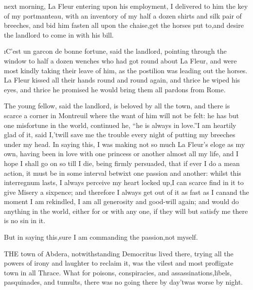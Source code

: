 \documentclass[twoside]{article}
\begin{document}


 next morning, La Fleur entering upon his employment, I delivered to
him the key of my portmanteau, with an inventory of my half a dozen
shirts and silk pair of breeches, and bid him fasten all upon the
chaise,\tsk get the horses put to,\tsk and desire the landlord to come in with
his bill.

\i{C’est un garcon de bonne fortune}, said the landlord, pointing through
the window to half a dozen wenches who had got round about La Fleur, and
were most kindly taking their leave of him, as the postilion was leading
out the horses.  La Fleur kissed all their hands round and round again,
and thrice he wiped his eyes, and thrice he promised he would bring them
all pardons from Rome.

\tsk The young fellow, said the landlord, is beloved by all the town, and
there is scarce a corner in Montreuil where the want of him will not be
felt: he has but one misfortune in the world, continued he, “he is always
in love.”\tsk I am heartily glad of it, said I,\tsk ’twill save me the trouble
every night of putting my breeches under my head.  In saying this, I was
making not so much La Fleur’s eloge as my own, having been in love with
one princess or another almost all my life, and I hope I shall go on so
till I die, being firmly persuaded, that if ever I do a mean action, it
must be in some interval betwixt one passion and another: whilst this
interregnum lasts, I always perceive my heart locked up,\tsk I can scarce
find in it to give Misery a sixpence; and therefore I always get out of
it as fast as I can\tsk and the moment I am rekindled, I am all generosity
and good-will again; and would do anything in the world, either for or
with any one, if they will but satisfy me there is no sin in it.

\tsk But in saying this,\tsk sure I am commanding the passion,\tsk not myself.






\tsk THE town of Abdera, notwithstanding Democritus lived there, trying all
the powers of irony and laughter to reclaim it, was the vilest and most
profligate town in all Thrace.  What for poisons, conspiracies, and
assassinations,\tsk libels, pasquinades, and tumults, there was no going
there by day\tsk ’twas worse by night.
\end{document}
